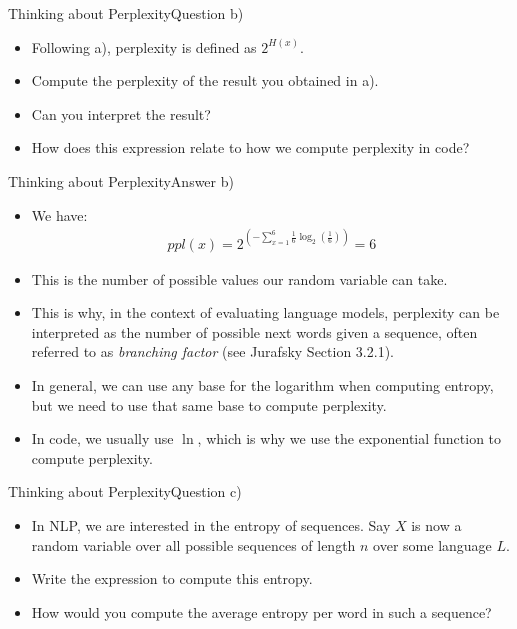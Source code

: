 \documentclass[t]{beamer}
\begin{document}
\begin{frame}{Thinking about Perplexity}{Question b)}
    \begin{itemize}
        \item Following a), perplexity is defined as $2^{H(x)}$.
        \item Compute the perplexity of the result you obtained in a).
        \item Can you interpret the result?
        \item How does this expression relate to how we compute perplexity in
              code?
    \end{itemize}
\end{frame}

\begin{frame}{Thinking about Perplexity}{Answer b)}
    \begin{itemize}
        \item We have:
              \begin{align*}
                  ppl(x) = 2^{\left(-\sum_{x=1}^6 \frac{1}{6}\log_2\left(\frac{1}{6}\right)\right)} = 6
              \end{align*}
        \item This is the number of possible values our random variable can
              take.
        \item This is why, in the context of evaluating language models,
              perplexity can be interpreted as the number of possible next words
              given a sequence, often referred to as \emph{branching factor}
              (see Jurafsky Section 3.2.1).
        \item In general, we can use any base for the logarithm when
              computing entropy, but we need to use that same base to compute
              perplexity.
        \item In code, we usually use $\ln$, which is why we use the exponential
              function to compute perplexity.
    \end{itemize}
\end{frame}

\begin{frame}{Thinking about Perplexity}{Question c)}
    \begin{itemize}
        \item In NLP, we are interested in the entropy of sequences.
              Say $X$ is now a random variable over all possible sequences of
              length $n$ over some language $L$.
        \item Write the expression to compute this entropy.
        \item How would you compute the average entropy per word in such a
              sequence?
    \end{itemize}
\end{frame}
\end{document}
